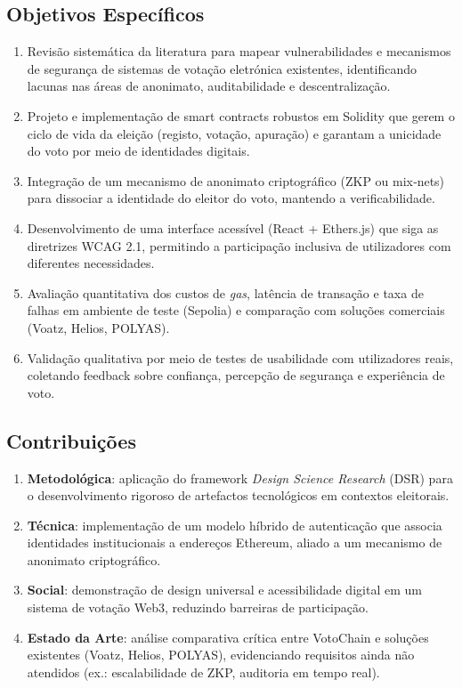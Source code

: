 \subsection{Objetivos Específicos}
\begin{enumerate}
    \item Revisão sistemática da literatura para mapear vulnerabilidades e mecanismos de segurança de sistemas de votação eletrónica existentes, identificando lacunas nas áreas de anonimato, auditabilidade e descentralização.
    \item Projeto e implementa{\c{c}}{\~a}o de smart contracts robustos em Solidity que gerem o ciclo de vida da elei{\c{c}}{\~a}o (registo, vota{\c{c}}{\~a}o, apura{\c{c}}{\~a}o) e garantam a unicidade do voto por meio de identidades digitais.
    \item Integração de um mecanismo de anonimato criptográfico (ZKP ou mix‑nets) para dissociar a identidade do eleitor do voto, mantendo a verificabilidade.
    \item Desenvolvimento de uma interface acessível (React + Ethers.js) que siga as diretrizes WCAG 2.1, permitindo a participação inclusiva de utilizadores com diferentes necessidades.
    \item Avaliação quantitativa dos custos de \textit{gas}, latência de transação e taxa de falhas em ambiente de teste (Sepolia) e comparação com soluções comerciais (Voatz, Helios, POLYAS).
    \item Valida{\c{c}}{\~a}o qualitativa por meio de testes de usabilidade com utilizadores reais, coletando feedback sobre confian{\c{c}}a, percep{\c{c}}{\~a}o de seguran{\c{c}}a e experi{\^e}ncia de voto.
\end{enumerate}

\subsection{Contribuições}
\begin{enumerate}
    \item \textbf{Metodol{\'o}gica}: aplica{\c{c}}{\~a}o do framework \textit{Design Science Research} (DSR) para o desenvolvimento rigoroso de artefactos tecnol{\'o}gicos em contextos eleitorais.
    \item \textbf{Técnica}: implementação de um modelo híbrido de autenticação que associa identidades institucionais a endereços Ethereum, aliado a um mecanismo de anonimato criptográfico.
    \item \textbf{Social}: demonstração de design universal e acessibilidade digital em um sistema de votação Web3, reduzindo barreiras de participação.
    \item \textbf{Estado da Arte}: análise comparativa crítica entre VotoChain e soluções existentes (Voatz, Helios, POLYAS), evidenciando requisitos ainda não atendidos (ex.: escalabilidade de ZKP, auditoria em tempo real).
\end{enumerate}

